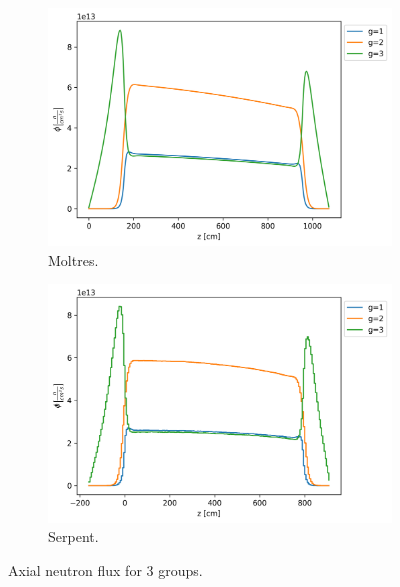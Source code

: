 \documentclass[11pt,letterpaper]{article}
\begin{document}
\begin{figure}[htbp!]
	\centering
	\begin{subfigure}[t]{0.4\textwidth}
		\centering
		\includegraphics[width=\linewidth]{figures/3D-assembly-noLBP-1200-26G}
		\caption{Moltres.}
	\end{subfigure}
	\begin{subfigure}[t]{0.4\textwidth}
		\centering
		\includegraphics[width=\linewidth]{figures/serpent26G-noLBP-1200-collapse}
		\caption{Serpent.}
	\end{subfigure}
	\hfill
	\caption{Axial neutron flux for 3 groups.}
	\label{fig:assembly-noLBP-1200-flux}
\end{figure}
\end{document}
